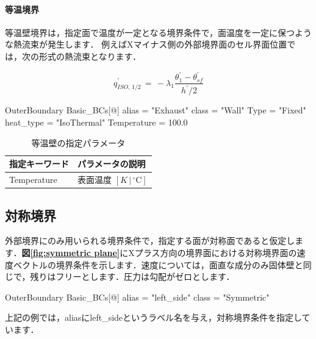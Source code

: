 %
\paragraph{等温境界}

等温壁境界は，指定面で温度が一定となる境界条件で，面温度を一定に保つような熱流束が発生します．
例えばXマイナス側の外部境界面のセル界面位置では，次の形式の熱流束となります．

\begin{equation}
q^{\prime}_{ISO,\,1/2} \,=\, -\mathit{\lambda}_1 \frac{\mathit{\theta}^{\prime}_1 - \mathit{\theta}^{\prime}_{sf}} {h^{\prime}\slash{2}}
\label{eq:qiso1}
\end{equation}

{\small
\begin{program}
OuterBoundary {
  Basic_BCs[@] {
    alias            = "Exhaust"
    class            = "Wall"
    Type             = "Fixed"
    heat_type        = "IsoThermal"
    Temperature      = 100.0
  }
}
\end{program}
}

\begin{table}[htdp]
\caption{等温壁の指定パラメータ}
\begin{center}
\small
\begin{tabular}{ll} \toprule
指定キーワード & パラメータの説明\\ \midrule
Temperature & 表面温度 $[K\,|\,{}^\circ\mathrm{C}]$\\
\bottomrule
\end{tabular}
\end{center}
\label{tbl:iso-thermal}
\end{table}


\pagebreak
\subsection{対称境界}

外部境界にのみ用いられる境界条件で，指定する面が対称面であると仮定します．\textbf{図\ref{fig:symmetric plane}}にXプラス方向の境界面における対称境界面の速度ベクトルの境界条件を示します．速度については，面直な成分のみ固体壁と同じで，残りはフリーとします．圧力は勾配がゼロとします．


{\small
\begin{program}
OuterBoundary {
  Basic_BCs[@] {
    alias    = "left_side"
    class    = "Symmetric"
  }
}
\end{program}
}


上記の例では，aliasにleft\_sideというラベル名を与え，対称境界条件を指定しています．

